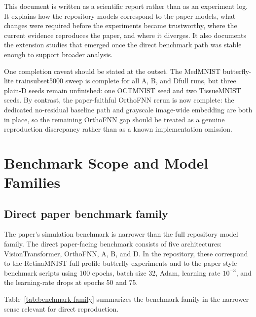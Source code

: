 \documentclass[11pt,a4paper]{article}
\def\texttt#1{#1}%
\def\_{}%
\begin{document}
This document is written as a scientific report rather than as an experiment log. It explains how the repository models correspond to the paper models, what changes were required before the experiments became trustworthy, where the current evidence reproduces the paper, and where it diverges. It also documents the extension studies that emerged once the direct benchmark path was stable enough to support broader analysis.

One completion caveat should be stated at the outset. The MedMNIST butterfly-lite \texttt{train\_subset\_5000} sweep is complete for all \texttt{A}, \texttt{B}, and \texttt{D\_full} runs, but three plain-\texttt{D} seeds remain unfinished: one OCTMNIST seed and two TissueMNIST seeds. By contrast, the paper-faithful \texttt{OrthoFNN} rerun is now complete: the dedicated no-residual baseline path and grayscale image-wide embedding are both in place, so the remaining \texttt{OrthoFNN} gap should be treated as a genuine reproduction discrepancy rather than as a known implementation omission.

\section{Benchmark Scope and Model Families}

\subsection{Direct paper benchmark family}

The paper's simulation benchmark is narrower than the full repository model family. The direct paper-facing benchmark consists of five architectures: \texttt{VisionTransformer}, \texttt{OrthoFNN}, \texttt{A}, \texttt{B}, and \texttt{D}. In the repository, these correspond to the RetinaMNIST full-profile butterfly experiments and to the paper-style benchmark scripts using 100 epochs, batch size 32, Adam, learning rate \(10^{-3}\), and the learning-rate drops at epochs 50 and 75.

Table~\ref{tab:benchmark-family} summarizes the benchmark family in the narrower sense relevant for direct reproduction.
\end{document}
